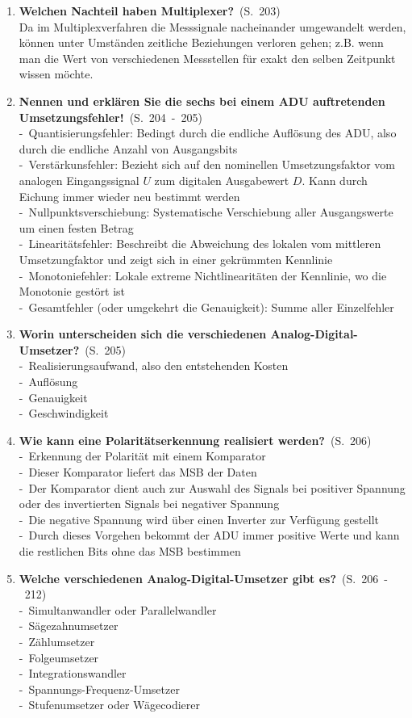 \documentclass[a4paper,12pt]{article}
\newcommand{\question}[3]{\pagebreak[3]\item {\textbf{#1?}}\ (S.\ #2)#3}
\newcommand{\statement}[3]{\pagebreak[3]\item {\textbf{#1!}}\ (S.\ #2)#3}
\newcommand{\catchword}[1]{\\-\ #1}
\newcommand{\normaltext}[1]{\\#1}
\newcommand{\page}[1]{#1}
\newcommand{\pages}[2]{#1\ -\ #2}
\begin{document}
\begin{enumerate}
  \question{Welchen Nachteil haben Multiplexer}{\page{203}}
  {
    \normaltext{Da im Multiplexverfahren die Messsignale nacheinander umgewandelt werden, können
                unter Umständen zeitliche Beziehungen verloren gehen; z.B. wenn man die Wert von
                verschiedenen Messstellen für exakt den selben Zeitpunkt wissen möchte.}
  }

  \statement{Nennen und erklären Sie die sechs bei einem ADU auftretenden
             Umsetzungsfehler}{\pages{204}{205}}
  {
    \catchword{Quantisierungsfehler: Bedingt durch die endliche Auflösung des ADU, also durch
               die endliche Anzahl von Ausgangsbits}
    \catchword{Verstärkunsfehler: Bezieht sich auf den nominellen Umsetzungsfaktor vom analogen
               Eingangssignal $U$ zum digitalen Ausgabewert $D$. Kann durch Eichung immer wieder
               neu bestimmt werden}
    \catchword{Nullpunktsverschiebung: Systematische Verschiebung aller Ausgangswerte um einen
               festen Betrag}
    \catchword{Linearitätsfehler: Beschreibt die Abweichung des lokalen vom mittleren Umsetzungfaktor
               und zeigt sich in einer gekrümmten Kennlinie}
    \catchword{Monotoniefehler: Lokale extreme Nichtlinearitäten der Kennlinie, wo die Monotonie
               gestört ist}
    \catchword{Gesamtfehler (oder umgekehrt die Genauigkeit): Summe aller Einzelfehler}
  }

  \question{Worin unterscheiden sich die verschiedenen Analog-Digital-Umsetzer}{\page{205}}
  {
    \catchword{Realisierungsaufwand, also den entstehenden Kosten}
    \catchword{Auflösung}
    \catchword{Genauigkeit}
    \catchword{Geschwindigkeit}
  }

  \question{Wie kann eine Polaritätserkennung realisiert werden}{\page{206}}
  {
    \catchword{Erkennung der Polarität mit einem Komparator}
    \catchword{Dieser Komparator liefert das MSB der Daten}
    \catchword{Der Komparator dient auch zur Auswahl des Signals bei positiver Spannung
               oder des invertierten Signals bei negativer Spannung}
    \catchword{Die negative Spannung wird über einen Inverter zur Verfügung gestellt}
    \catchword{Durch dieses Vorgehen bekommt der ADU immer positive Werte und kann die
               restlichen Bits ohne das MSB bestimmen}
  }

  \question{Welche verschiedenen Analog-Digital-Umsetzer gibt es}{\pages{206}{212}}
  {
    \catchword{Simultanwandler oder Parallelwandler}
    \catchword{Sägezahnumsetzer}
    \catchword{Zählumsetzer}
    \catchword{Folgeumsetzer}
    \catchword{Integrationswandler}
    \catchword{Spannungs-Frequenz-Umsetzer}
    \catchword{Stufenumsetzer oder Wägecodierer}
  }


\end{enumerate}
\end{document}
